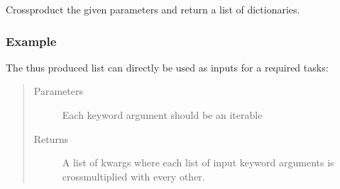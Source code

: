 \documentclass[letterpaper,10pt,english]{sphinxmanual}
\begin{document}
\begin{fulllineitems}
\label{\detokenize{documentation/api:b2luigi.core.utils.product_dict}}
Cross\sphinxhyphen{}product the given parameters and return a list of dictionaries.
\subsubsection*{Example}

\begin{sphinxVerbatim}[commandchars=\\\{\}]
\PYG{p}{[} \PYG{p}{]} \PYG{p}{[} \PYG{p}{]}
\end{sphinxVerbatim}

The thus produced list can directly be used as inputs for a required tasks:

\begin{sphinxVerbatim}[commandchars=\\\{\}]
 
       \PYG{p}{[} \PYG{p}{]} \PYG{p}{[} \PYG{p}{]}
         
\end{sphinxVerbatim}
\begin{quote}\begin{description}
\item[{Parameters}] \leavevmode
{} \textendash{} Each keyword argument should be an iterable

\item[{Returns}] \leavevmode
A list of kwargs where each list of input keyword arguments is cross\sphinxhyphen{}multiplied with every other.

\end{description}\end{quote}

\end{fulllineitems}
\end{document}
